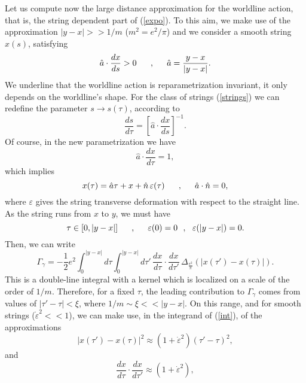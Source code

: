 \documentclass[a4paper,12pt]{article}
\begin{document}
Let us compute now the large distance approximation for the worldline action, that is, the string dependent part of (\ref{expo}). To this aim, we make use of the approximation $|y-x|>>1/m$ ($m^2=e^2 /\pi$) and we consider a smooth string $x(s)$, satisfying
\begin{equation}
\hat{a}\cdot\frac{dx}{ds}>0 \makebox[.5in]{,} \hat{a}=\frac{y-x}{|y-x|}.
\label{strings}
\end{equation}
We underline that the worldline action is reparametrization invariant, it only depends on the worldline's shape. For the class of strings (\ref{strings}) we can redefine the parameter $s \rightarrow s(\tau)$, according to
\begin{equation}
\frac{ds}{d\tau}=\left[ \hat{a} \cdot \frac{dx}{ds}\right]^{-1}.
\end{equation}
Of course, in the new parametrization we have
\begin{equation}
\hat{a} \cdot \frac{dx}{d\tau}=1,
\end{equation}
which implies
\begin{equation}
x(\tau)=\hat{a}\tau + x +\hat{n}\, \varepsilon(\tau)\makebox[.5in]{,} \hat{a} \cdot \hat{n}=0,
\label{param}
\end{equation}
where $\varepsilon$ gives the string transverse deformation with respect to the straight line.
As the string runs from $x$ to $y$, we must have
\begin{equation}
\tau \in [0, |y-x|]\makebox[.5in]{,} \varepsilon (0)=0~~,~~\varepsilon(|y-x|)=0.
\label{bcond}
\end{equation}
Then, we can write
\begin{equation}
\Gamma_\gamma=-\frac{1}{2}e^2\int_0^{|y-x|} d\tau \int_0^{|y-x|} d\tau'\, 
\frac{dx}{d\tau} \cdot \frac{dx}{d\tau'}\,
\Delta_{\frac{e^2}{\pi}}\left(|x(\tau')-x(\tau)|\right).
\label{int}
\end{equation}
This is a double-line integral with a kernel which is localized on a scale of the order of $1/m$. Therefore, for a fixed $\tau$, the leading contribution to $\Gamma_\gamma$ comes
from values of $|\tau'-\tau| < \xi$, where 
$1/m \sim \xi << |y-x|$. On this range, and for smooth strings ($\dot{\varepsilon}^2<<1$),
we can make use, in the integrand of (\ref{int}), of the approximations
\begin{equation}
|x(\tau')-x(\tau)|^2\approx \left(1+\dot{\varepsilon}^2\right)(\tau'-\tau)^2,
\end{equation}
and
\begin{equation}
\frac{dx}{d\tau} \cdot \frac{dx}{d\tau'}\approx \left( 1+ \dot{\varepsilon}^2\right),
\end{equation}
\end{document}

